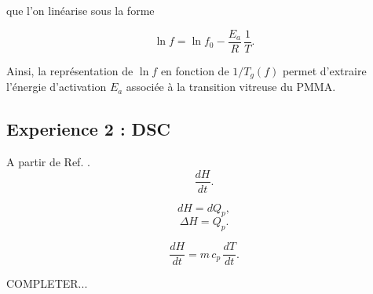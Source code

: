 que l’on linéarise sous la forme

\begin{equation}
    \ln f = \ln f_0 - \frac{E_a}{R}\,\frac{1}{T}.
	\label{eq:arrheniuslin}
\end{equation}

Ainsi, la représentation de $\ln f$ en fonction de $1/T_g(f)$ permet d’extraire l’énergie
d’activation $E_a$ associée à la transition vitreuse du PMMA.

\newpage

\subsection{Experience 2 : DSC}

A partir de Ref. \cite{protocoleDSC}.
\begin{equation}
    \frac{dH}{dt}.
\end{equation}

\begin{equation}
    dH = dQ_p,
\end{equation}
\begin{equation}
    \Delta H = Q_p.
\end{equation}

\begin{equation}
    \frac{dH}{dt} = m\,c_p\,\frac{dT}{dt}.
\end{equation}




COMPLETER...

